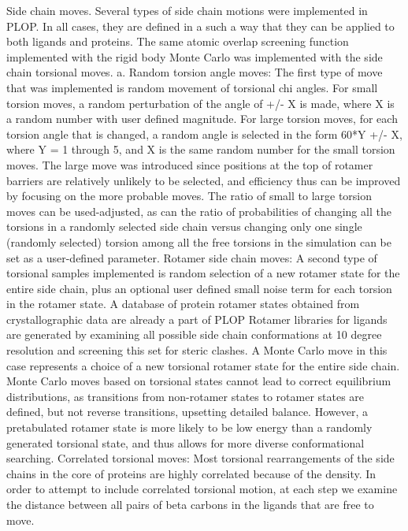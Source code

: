Side chain moves.
Several types of side chain motions were implemented in PLOP.
In all cases, they are defined in a such a way that they can be applied to both ligands and proteins.
The same atomic overlap screening function implemented with the rigid body Monte Carlo was implemented with the side chain torsional moves.
a. Random torsion angle moves: The first type of move that was implemented is random movement of torsional chi angles.
For small torsion moves, a random perturbation of the angle of +/- X is made, where X is a random number with user defined magnitude.
For large torsion moves, for each torsion angle that is changed, a random angle is selected in the form 60*Y +/- X, where Y = 1 through 5, and X is the same random number for the small torsion moves.
The large move was introduced since positions at the top of rotamer barriers are relatively unlikely to be selected, and efficiency thus can be improved by focusing on the more probable moves.
The ratio of small to large torsion moves can be used-adjusted, as can the ratio of probabilities of changing all the torsions in a randomly selected side chain versus changing only one single (randomly selected) torsion among all the free torsions in the simulation can be set as a user-defined parameter.
Rotamer side chain moves: A second type of torsional samples implemented is random selection of a new rotamer state for the entire side chain, plus an optional user defined small noise term for each torsion in the rotamer state.
A database of protein rotamer states obtained from crystallographic data are already a part of PLOP \cite{xiang2001extending} Rotamer libraries for ligands are generated by examining all possible side chain conformations at 10 degree resolution and screening this set for steric clashes.
A Monte Carlo move in this case represents a choice of a new torsional rotamer state for the entire side chain.
Monte Carlo moves based on torsional states cannot lead to correct equilibrium distributions, as transitions from non-rotamer states to rotamer states are defined, but not reverse transitions, upsetting detailed balance.
However, a pretabulated rotamer state is more likely to be low energy than a randomly generated torsional state, and thus allows for more diverse conformational searching.
Correlated torsional moves: Most torsional rearrangements of the side chains in the core of proteins are highly correlated because of the density.
In order to attempt to include correlated torsional motion, at each step we examine the distance between all pairs of beta carbons in the ligands that are free to move.
